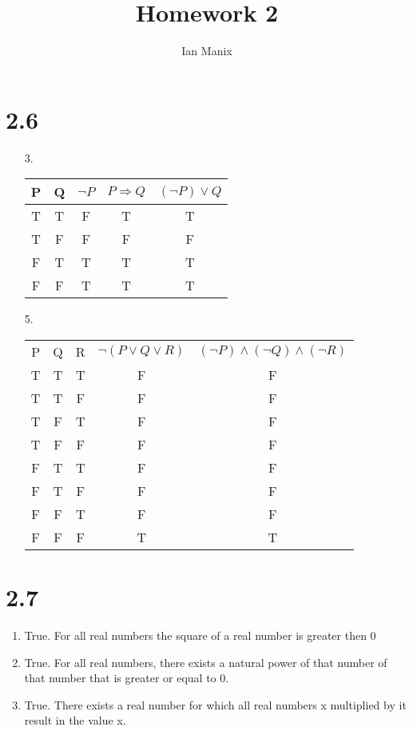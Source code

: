 \documentclass[sigconf]{article}
\title{
  \textbf{Homework 2} \\
  }
\author{ 
  Ian Manix
  }
\begin{document}



\maketitle




\section*{2.6}
\begin{itemize}
  \item[3.] \hfill
\begin{center}
\begin{tabular}{ |c|c||c||c|c|}
\hline
P & Q & $\neg P$ & $P \Rightarrow Q$ & $(\neg P) \lor Q$ \\
\hline
T&T&F&T&T\\
\hline
T&F&F&F&F\\
\hline
F&T&T&T&T\\
\hline
F&F&T&T&T\\
\hline
\end{tabular}
\end{center}

\item[5.] \hfill
\begin{center}
\begin{tabular}{ |c|c|c||c|c|}
\hline
P & Q & R & $\neg (P \lor Q \lor R)$ & $(\neg P) \land (\neg Q) \land (\neg R)$ \\
T&T&T&F&F\\
\hline
T&T&F&F&F\\
\hline
T&F&T&F&F\\
\hline
T&F&F&F&F\\
\hline
F&T&T&F&F\\
\hline
F&T&F&F&F\\
\hline
F&F&T&F&F\\
\hline
F&F&F&T&T\\
\hline
\end{tabular}
\end{center}
\end{itemize}

\section*{2.7}
\begin{enumerate}
  \item True. For all real numbers the square of a real number is greater then 0
  \item True. For all real numbers, there exists a natural power of that number of that number that is greater or equal to 0.
  \item True. There exists a real number for which all real numbers x multiplied by it result in the value x. 
\end{enumerate}
\end{document}

